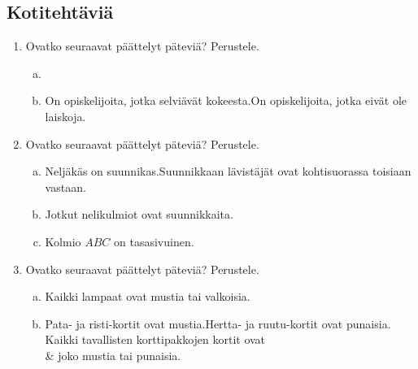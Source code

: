\newpage
\subsection*{Kotitehtäviä}

\begin{enumerate}
    \item Ovatko seuraavat päättelyt päteviä? Perustele.
        \begin{enumerate}[a)]
            \item {}
            \item {}
                {On opiskelijoita, jotka selviävät kokeesta.}{On opiskelijoita, jotka eivät ole laiskoja.}
        \end{enumerate}
    \item Ovatko seuraavat päättelyt päteviä? Perustele.
        \begin{enumerate}[a)]
            \item {}
                {Neljäkäs on suunnikas.}{Suunnikkaan lävistäjät ovat kohtisuorassa toisiaan vastaan.}
            \item {}
                {Jotkut nelikulmiot ovat suunnikkaita.}
            \item {}
                {Kolmio $ABC$ on tasasivuinen.}
        \end{enumerate}
    \item Ovatko seuraavat päättelyt päteviä? Perustele.
        \begin{enumerate}[a)]
            \item {}
                {Kaikki lampaat ovat mustia tai valkoisia.}
            \item {}
                {Pata- ja risti-kortit ovat mustia.}{Hertta- ja ruutu-kortit ovat punaisia.}
                {Kaikki tavallisten korttipakkojen kortit ovat\\ & joko mustia tai punaisia.}
        \end{enumerate}

\end{enumerate}
